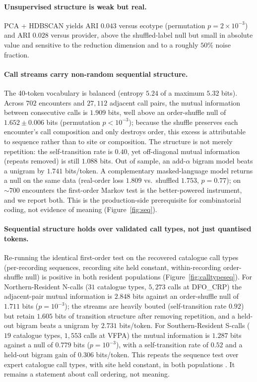 \documentclass[11pt]{article}
\begin{document}
\paragraph{Unsupervised structure is weak but real.} PCA + HDBSCAN yields ARI $0.043$ versus
ecotype (permutation $p=2\times10^{-3}$) and ARI $0.028$ versus provider, above the
shuffled-label null but small in absolute value and sensitive to the reduction dimension and
to a roughly $50\%$ noise fraction.

\paragraph{Call streams carry non-random sequential structure.} The 40-token vocabulary is
balanced (entropy $5.24$ of a maximum $5.32$ bits). Across $702$ encounters and $27{,}112$
adjacent call pairs, the mutual information between consecutive calls is $1.909$ bits, well
above an order-shuffle null of $1.652 \pm 0.006$ bits (permutation $p<10^{-3}$); because the
shuffle preserves each encounter's call composition and only destroys order, this excess is
attributable to sequence rather than to site or composition. The structure is not merely
repetition: the self-transition rate is $0.40$, yet off-diagonal mutual information (repeats
removed) is still $1.088$ bits. Out of sample, an add-$\alpha$ bigram model beats a unigram by
$1.741$ bits/token. A complementary masked-language model returns a null on the same data
(real-order loss $1.809$ vs.\ shuffled $1.753$, $p=0.77$); on $\sim\!700$ encounters the
first-order Markov test is the better-powered instrument, and we report both. This is the
production-side prerequisite for combinatorial coding, not evidence of meaning
(Figure~\ref{fig:seq}).

\paragraph{Sequential structure holds over validated call types, not just quantised tokens.}
Re-running the identical first-order test on the recovered catalogue call types (per-recording
sequences, recording site held constant, within-recording order-shuffle null) is positive in
both resident populations (Figure~\ref{fig:calltypeseq}). For Northern-Resident N-calls
($31$ catalogue types, $5{,}273$ calls at DFO\_CRP) the adjacent-pair mutual information is
$2.848$ bits against an order-shuffle null of $1.711$ bits ($p=10^{-3}$); the streams are
heavily bouted (self-transition rate $0.92$) but retain $1.605$ bits of transition structure
after removing repetition, and a held-out bigram beats a unigram by $2.731$ bits/token. For
Southern-Resident S-calls ($19$ catalogue types, $1{,}553$ calls at VFPA) the mutual
information is $1.287$ bits against a null of $0.779$ bits ($p=10^{-3}$), with a
self-transition rate of $0.52$ and a held-out bigram gain of $0.306$ bits/token. This repeats
the sequence test over expert catalogue call types, with site held constant, in both populations
\citep{ford1989,filatova2015,sharma2024}. It remains a statement about call ordering, not
meaning.
\end{document}
